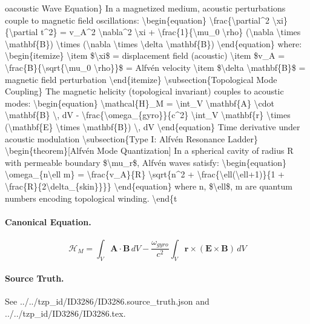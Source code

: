 oacoustic Wave Equation\} In a magnetized medium, acoustic perturbations couple to magnetic field oscillations: \textbackslash{}begin\{equation\} \textbackslash{}frac\{\textbackslash{}partial\textasciicircum{}2 \textbackslash{}xi\}\{\textbackslash{}partial t\textasciicircum{}2\} = v\_A\textasciicircum{}2 \textbackslash{}nabla\textasciicircum{}2 \textbackslash{}xi + \textbackslash{}frac\{1\}\{\textbackslash{}mu\_0 \textbackslash{}rho\} (\textbackslash{}nabla \textbackslash{}times \textbackslash{}mathbf\{B\}) \textbackslash{}times (\textbackslash{}nabla \textbackslash{}times \textbackslash{}delta \textbackslash{}mathbf\{B\}) \textbackslash{}end\{equation\} where: \textbackslash{}begin\{itemize\} \textbackslash{}item \$\textbackslash{}xi\$ = displacement field (acoustic) \textbackslash{}item \$v\_A = \textbackslash{}frac\{B\}\{\textbackslash{}sqrt\{\textbackslash{}mu\_0 \textbackslash{}rho\}\}\$ = Alfvén velocity \textbackslash{}item \$\textbackslash{}delta \textbackslash{}mathbf\{B\}\$ = magnetic field perturbation \textbackslash{}end\{itemize\} \textbackslash{}subsection\{Topological Mode Coupling\} The magnetic helicity (topological invariant) couples to acoustic modes: \textbackslash{}begin\{equation\} \textbackslash{}mathcal\{H\}\_M = \textbackslash{}int\_V \textbackslash{}mathbf\{A\} \textbackslash{}cdot \textbackslash{}mathbf\{B\} \textbackslash{}, dV - \textbackslash{}frac\{\textbackslash{}omega\_\{gyro\}\}\{c\textasciicircum{}2\} \textbackslash{}int\_V \textbackslash{}mathbf\{r\} \textbackslash{}times (\textbackslash{}mathbf\{E\} \textbackslash{}times \textbackslash{}mathbf\{B\}) \textbackslash{}, dV \textbackslash{}end\{equation\} Time derivative under acoustic modulation \textbackslash{}subsection\{Type I: Alfvén Resonance Ladder\} \textbackslash{}begin\{theorem\}[Alfvén Mode Quantization] In a spherical cavity of radius R with permeable boundary \$\textbackslash{}mu\_r\$, Alfvén waves satisfy: \textbackslash{}begin\{equation\} \textbackslash{}omega\_\{n\textbackslash{}ell m\} = \textbackslash{}frac\{v\_A\}\{R\} \textbackslash{}sqrt\{n\textasciicircum{}2 + \textbackslash{}frac\{\textbackslash{}ell(\textbackslash{}ell+1)\}\{1 + \textbackslash{}frac\{R\}\{2\textbackslash{}delta\_\{skin\}\}\}\} \textbackslash{}end\{equation\} where n, \$\textbackslash{}ell\$, m are quantum numbers encoding topological winding. \textbackslash{}end\{t

\paragraph{Canonical Equation.}
\[
\begin{equation} \mathcal{H}_M = \int_V \mathbf{A} \cdot \mathbf{B} \, dV - \frac{ \omega_{gyro}}{c^2} \int_V \mathbf{r} \times ( \mathbf{E} \times \mathbf{B}) \, dV \end{equation}
\]

\paragraph{Source Truth.}
See ../../tzp\_id/ID3286/ID3286.source\_truth.json and ../../tzp\_id/ID3286/ID3286.tex.
